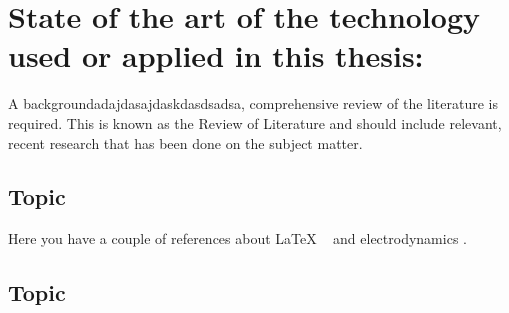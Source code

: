 \clearpage
\section{State of the art of the technology used or applied in this thesis:}

 {A backgroundadajdasajdaskdasdsadsa, comprehensive review of the literature is required. This is known as the Review of Literature and should
  include relevant, recent research that has been done on the subject matter.}

\subsection{Topic}

Here you have a couple of references about LaTeX ~\cite{latexcompanion} and electrodynamics \cite{einstein}.

\bigskip

\subsection{Topic}
